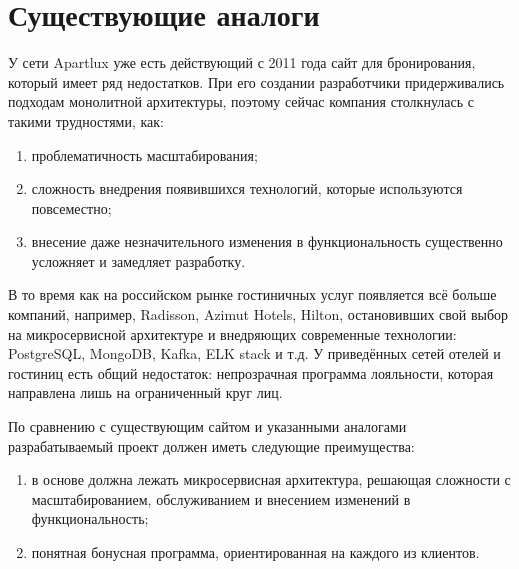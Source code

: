 \section*{Существующие аналоги}
У сети Apartlux уже есть действующий с 2011 года сайт для бронирования, который имеет ряд недостатков. При его создании разработчики придерживались подходам монолитной архитектуры, поэтому сейчас компания столкнулась с такими трудностями, как:
\begin{enumerate}
	\item проблематичность масштабирования;
	
	\item сложность внедрения появившихся технологий, которые используются повсеместно;
	
	\item внесение даже незначительного изменения в функциональность существенно усложняет и замедляет разработку.
\end{enumerate}

В то время как на российском рынке гостиничных услуг появляется всё больше компаний, например, Radisson, Azimut Hotels, Hilton, остановивших свой выбор на микросервисной архитектуре и внедряющих современные технологии: PostgreSQL, MongoDB, Kafka, ELK stack и т.д. У приведённых сетей отелей и гостиниц есть общий недостаток: непрозрачная программа лояльности, которая направлена лишь на ограниченный круг лиц.

По сравнению с существующим сайтом и указанными аналогами разрабатываемый проект должен иметь следующие преимущества:
\begin{enumerate}
	\item в основе должна лежать микросервисная архитектура, решающая сложности с масштабированием, обслуживанием и внесением изменений в функциональность;
	
	\item понятная бонусная программа, ориентированная на каждого из клиентов.
\end{enumerate}

